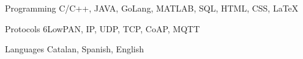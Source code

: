 


\begin{cvskills}


\cvskill
{Programming} %
{C/C++, JAVA, GoLang, MATLAB, SQL, HTML, CSS, LaTeX} %


\cvskill
{Protocols} %
{6LowPAN, IP, UDP, TCP, CoAP, MQTT} %


\cvskill
{Languages} %
{Catalan, Spanish, English} %


\end{cvskills}